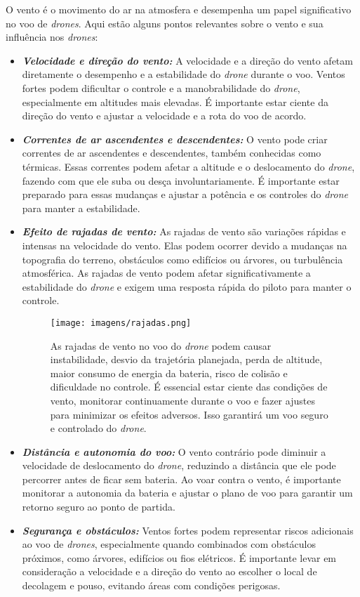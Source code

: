 \documentclass[a4paper, 12pt, onecolumn,singlespacing]{article}
\begin{document}
	O vento é o movimento do ar na atmosfera e desempenha um papel significativo no voo de \textit{drones}. Aqui estão alguns pontos relevantes sobre o vento e sua influência nos \textit{drones}:
	\begin{itemize}
		\item \textbf{\textit{Velocidade e direção do vento:}} A velocidade e a direção do vento afetam diretamente o desempenho e a estabilidade do \textit{drone} durante o voo. Ventos fortes podem dificultar o controle e a manobrabilidade do \textit{drone}, especialmente em altitudes mais elevadas. É importante estar ciente da direção do vento e ajustar a velocidade e a rota do voo de acordo.
		
		\item \textbf{\textit{Correntes de ar ascendentes e descendentes:}} O vento pode criar correntes de ar ascendentes e descendentes, também conhecidas como térmicas. Essas correntes podem afetar a altitude e o deslocamento do \textit{drone}, fazendo com que ele suba ou desça involuntariamente. É importante estar preparado para essas mudanças e ajustar a potência e os controles do \textit{drone} para manter a estabilidade.
		
		\item \textbf{\textit{Efeito de rajadas de vento:}} As rajadas de vento são variações rápidas e intensas na velocidade do vento. Elas podem ocorrer devido a mudanças na topografia do terreno, obstáculos como edifícios ou árvores, ou turbulência atmosférica. As rajadas de vento podem afetar significativamente a estabilidade do \textit{drone} e exigem uma resposta rápida do piloto para manter o controle.
		
			\begin{figure}[h]
			\centering
			\texttt{[image: imagens/rajadas.png]}
			\caption{As rajadas de vento no voo do \textit{drone} podem causar instabilidade, desvio da trajetória planejada, perda de altitude, maior consumo de energia da bateria, risco de colisão e dificuldade no controle. É essencial estar ciente das condições de vento, monitorar continuamente durante o voo e fazer ajustes para minimizar os efeitos adversos. Isso garantirá um voo seguro e controlado do \textit{drone}.}
			\label{fig:rajadas}
		\end{figure}
		
		\item \textbf{\textit{Distância e autonomia do voo:}} O vento contrário pode diminuir a velocidade de deslocamento do \textit{drone}, reduzindo a distância que ele pode percorrer antes de ficar sem bateria. Ao voar contra o vento, é importante monitorar a autonomia da bateria e ajustar o plano de voo para garantir um retorno seguro ao ponto de partida.
		
		\item \textbf{\textit{Segurança e obstáculos:}} Ventos fortes podem representar riscos adicionais ao voo de \textit{drones}, especialmente quando combinados com obstáculos próximos, como árvores, edifícios ou fios elétricos. É importante levar em consideração a velocidade e a direção do vento ao escolher o local de decolagem e pouso, evitando áreas com condições perigosas.
		
	\end{itemize}
	
\end{document}
